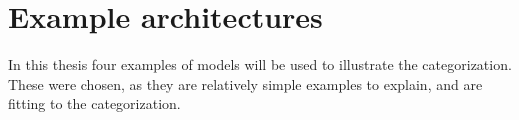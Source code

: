 \chapter{Example architectures}


In this thesis four examples of models will be used to illustrate the categorization. These were chosen, as they are relatively simple examples to explain, and are fitting to the categorization.



